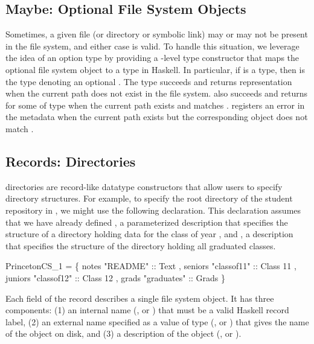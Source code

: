 \subsection{Maybe: Optional File System Objects}
\label{sec:maybe}
Sometimes, a given file (or directory or symbolic link) may or may not
be present in the file system, and either case is valid.
To handle this situation, we leverage the idea of an option type by
providing a \forest{}-level  type constructor that maps the
optional file system object to a  type in Haskell. In particular,
if  is a \forest{} type, then  is the
\forest{} type denoting an optional .  The type
 succeeds and returns representation  when the
current path does not exist in the file system.   also
succeeds and returns  for some  of type  
when the current path exists and matches .  
registers an error in the metadata when the current path exists but
the corresponding object does not match . 


\subsection{Records: Directories}
\label{sec:directories}
\forest{} directories are record-like datatype constructors that allow
users to specify directory structures. For example, to specify the root directory
of the student repository in , we might use
the following declaration.  This declaration assumes that we have already
defined , a parameterized description that specifies
the structure of a directory holding data for the class of year ,
and , a description that specifies the structure of the
directory holding all graduated classes.   
\begin{code}
 PrincetonCS_1 = 
  \{ notes    "README"    :: Text
  , seniors  "classof11" :: Class 11
  , juniors  "classof12" :: Class 12
  , grads    "graduates" :: Grads \}
\end{code}
Each field of the record describes a single file system object.  It has three components:  
(1) an internal name (\eg{},  or ) that
must be a valid Haskell record label, 
(2) an external name specified as a value of type 
(\eg{},  or  ) that gives the name of the
object on disk, and 
(3) a \forest{} description of the object (\eg{},  or ).

